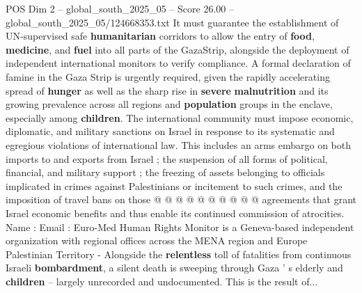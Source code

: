 \begin{textsample}{POS Dim 2 – global\_south\_2025\_05 – Score 26.00 – global\_south\_2025\_05/124668353.txt}
It must guarantee the establishment of UN-supervised safe \textbf{humanitarian} corridors to allow the entry of \textbf{food}, \textbf{medicine}, and \textbf{fuel} into all parts of the GazaStrip, alongside the deployment of independent international monitors to verify compliance.
A formal declaration of famine in the Gaza Strip is urgently required, given the rapidly accelerating spread of \textbf{hunger} as well as the sharp rise in \textbf{severe} \textbf{malnutrition} and its growing prevalence across all regions and \textbf{population} groups in the enclave, especially among \textbf{children}.
The international community must impose economic, diplomatic, and military sanctions on Israel in response to its systematic and egregious violations of international law.
This includes an arms embargo on both imports to and exports from Israel ; the suspension of all forms of political, financial, and military support ; the freezing of assets belonging to officials implicated in crimes against Palestinians or incitement to such crimes, and the imposition of travel bans on those @ @ @ @ @ @ @ @ @ @ agreements that grant Israel economic benefits and thus enable its continued commission of atrocities.
Name : Email : Euro-Med Human Rights Monitor is a Geneva-based independent organization with regional offices across the MENA region and Europe Palestinian Territory - Alongside the \textbf{relentless} toll of fatalities from continuous Israeli \textbf{bombardment}, a silent death is sweeping through Gaza ' s elderly and \textbf{children} -- largely unrecorded and undocumented.
This is the result of...

\end{textsample}
